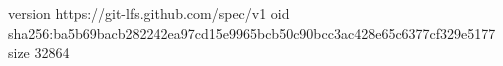 version https://git-lfs.github.com/spec/v1
oid sha256:ba5b69bacb282242ea97cd15e9965bcb50c90bcc3ac428e65c6377cf329e5177
size 32864
